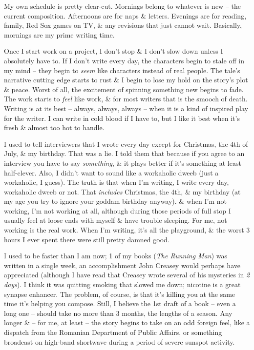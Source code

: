 \documentclass{article}
\numberwithin{equation}{section}
\begin{document}
My own schedule is pretty clear-cut. Mornings belong to whatever is new -- the current composition. Afternoons are for naps \& letters. Evenings are for reading, family, Red Sox games on TV, \& any revisions that just cannot wait. Basically, mornings are my prime writing time.

Once I start work on a project, I don't stop \& I don't slow down unless I absolutely have to. If I don't write every day, the characters begin to stale off in my mind -- they begin to \textit{seem} like characters instead of real people. The tale's narrative cutting edge starts to rust \& I begin to lose my hold on the story's plot \& peace. Worst of all, the excitement of spinning something new begins to fade. The work starts to \textit{feel} like work, \& for most writers that is the smooch of death. Writing is at its best -- always, always, always -- when it is a kind of inspired play for the writer. I can write in cold blood if I have to, but I like it best when it's fresh \& almost too hot to handle.

I used to tell interviewers that I wrote every day except for Christmas, the 4th of July, \& my birthday. That was a lie. I told them that because if you agree to an interview you have to say \textit{something}, \& it plays better if it's something at least half-clever. Also, I didn't want to sound like a workaholic dweeb (just a workaholic, I guess). The truth is that when I'm writing, I write every day, workaholic dweeb or not. That \textit{includes} Christmas, the 4th, \& my birthday (at my age you try to ignore your goddam birthday anyway). \& when I'm not working, I'm not working at all, although during those periods of full stop I usually feel at loose ends with myself \& have trouble sleeping. For me, not working is the real work. When I'm writing, it's all the playground, \& the worst 3 hours I ever spent there were still pretty damned good.

I used to be faster than I am now; 1 of my books (\textit{The Running Man}) was written in a single week, an accomplishment John Creasey would perhaps have appreciated (although I have read that Creasey wrote several of his mysteries in \textit{2 days}). I think it was quitting smoking that slowed me down; nicotine is a great synapse enhancer. The problem, of course, is that it's killing you at the same time it's helping you compose. Still, I believe the 1st draft of a book -- even a long one -- should take no more than 3 months, the lengths of a season. Any longer \& -- for me, at least -- the story begins to take on an odd foreign feel, like a dispatch from the Romanian Department of Public Affairs, or something broadcast on high-band shortwave during a period of severe sunspot activity.
\end{document}
